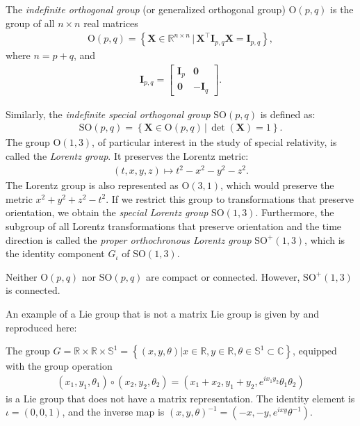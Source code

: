 \begin{example}\label{ex:indefinite-orthogonal-group-lorentz-group}
    The \emph{indefinite orthogonal group} (or generalized orthogonal group) $\text{O}(p,q)$ is the group of all $n\times n$ real matrices
    \begin{align}
        \text{O}(p,q) = \left\{\mathbf{X}\in\mathbb{R}^{n\times n} \,|\, \mathbf{X}^\top\mathbf{I}_{p,q}\mathbf{X} = \mathbf{I}_{p,q}\right\},
    \end{align}
    where $n=p+q$, and
    \begin{align}
        \mathbf{I}_{p,q} = \begin{bmatrix}
            \mathbf{I}_p & \mathbf{0}\\
            \mathbf{0} & -\mathbf{I}_q
        \end{bmatrix}.
    \end{align}

    Similarly, the \emph{indefinite special orthogonal group} $\text{SO}(p,q)$ is defined as:
    \begin{align}
        \text{SO}(p, q) = \left\{\mathbf{X}\in\text{O}(p, q) \,|\, \det(\mathbf{X})=1\right\}.
    \end{align}
    The group $\text{O}(1,3)$, of particular interest in the study of special relativity, is called the \emph{Lorentz group}. It preserves the Lorentz metric:
    \begin{align}
        (t,x,y,z) \mapsto t^2 - x^2 - y^2 - z^2.
    \end{align}
    The Lorentz group is also represented as $\text{O}(3,1)$, which would preserve the metric $x^2 + y^2 + z^2 - t^2$. If we restrict this group to transformations that preserve orientation, we obtain the \emph{special Lorentz group} $\text{SO}(1,3)$. Furthermore, the subgroup of all Lorentz transformations that preserve orientation and the time direction is called the  \emph{proper orthochronous Lorentz group} $\text{SO}^+(1,3)$, which is the identity component $G_\iota$ of $\text{SO}(1,3)$.
    
    Neither $\text{O}(p,q)$ nor $\text{SO}(p,q)$ are compact or connected. However, $\text{SO}^+(1,3)$ is connected.
\end{example}
\begin{example}\label{ex:non-matrix-lie-group}
    An example of a Lie group that is not a matrix Lie group is given by \citet[p. 25]{Hall2015} and reproduced here:

    The group $G = \mathbb{R} \times \mathbb{R} \times \mathbb{S}^1 = \left\{(x, y, \theta) | x \in \mathbb{R}, y \in \mathbb{R}, \theta \in \mathbb{S}^1\subset\mathbb{C}\right\}$, equipped with the group operation
    \begin{align}
        (x_1, y_1, \theta_1)\circ (x_2, y_2, \theta_2) = (x_1 + x_2, y_1 + y_2, e^{ix_1y_2}\theta_1\theta_2)
    \end{align}
    is a Lie group that does not have a matrix representation. The identity element is $\iota=(0, 0, 1)$, and the inverse map is $(x, y, \theta)^{-1} = (-x, -y, e^{ixy}\theta^{-1})$.
\end{example} 

